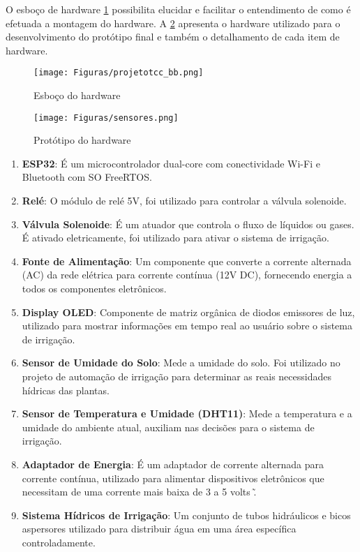 \documentclass[%
  article,%
  a4paper,%
  12pt,%
  fleqn,%
  oneside,%
  chapter = TITLE,%
  section = TITLE,%
]{abntex2}
\begin{document}
\newpage

O esboço de hardware \cref{fig:esbohard} possibilita elucidar e facilitar o entendimento de como é efetuada a montagem do hardware. A \cref{fig:PROTOTIPO} apresenta o hardware utilizado para o desenvolvimento do protótipo final e também o detalhamento de cada item de hardware.

\begin{figure}[!htb]
    \centering
    \caption{Esboço do hardware}
    \texttt{[image: Figuras/projetotcc\_bb.png]}
    \label{fig:esbohard}
\end{figure}

\begin{figure}[ht]
    \centering
    \caption{Protótipo do hardware}
    \texttt{[image: Figuras/sensores.png]}
    \label{fig:PROTOTIPO}
\end{figure}



\begin{enumerate}[label=\textbf{\arabic*.}]
    \item \textbf{ESP32}: É um microcontrolador dual-core com conectividade Wi-Fi e Bluetooth com SO FreeRTOS.
    \item \textbf{Relé}: O módulo de relé 5V, foi utilizado para controlar a válvula solenoide.
    \item \textbf{Válvula Solenoide}: É um atuador que controla o fluxo de líquidos ou gases. É ativado eletricamente, foi utilizado para ativar o sistema de irrigação.
    \item \textbf{Fonte de Alimentação}: Um componente que converte a corrente alternada (AC) da rede elétrica para corrente contínua (12V DC), fornecendo energia a todos os componentes eletrônicos.
    \item \textbf{Display OLED}: Componente de matriz orgânica de diodos emissores de luz, utilizado para mostrar informações em tempo real ao usuário sobre o sistema de irrigação.
    \item \textbf{Sensor de Umidade do Solo}: Mede a umidade do solo. Foi utilizado no projeto de automação de irrigação para determinar as reais necessidades hídricas das plantas.
    \item \textbf{Sensor de Temperatura e Umidade (DHT11)}: Mede a temperatura e a umidade do ambiente atual, auxiliam nas decisões para o sistema de irrigação.
    \item \textbf{Adaptador de Energia}: É um adaptador de corrente alternada para corrente contínua, utilizado para alimentar dispositivos eletrônicos que necessitam de uma corrente mais baixa de 3 a 5 volts \~.
    \item \textbf{Sistema Hídricos de Irrigação}: Um conjunto de tubos hidráulicos e bicos aspersores utilizado para distribuir água em uma área específica controladamente. 
\end{enumerate}
\end{document}
